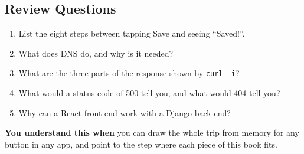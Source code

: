 \subsection*{Review Questions}\label{webapp-04:review-questions}

\begin{enumerate}
\def\labelenumi{\arabic{enumi}.}
\tightlist
\item
  List the eight steps between tapping Save and seeing ``Saved!''.
\item
  What does DNS do, and why is it needed?
\item
  What are the three parts of the response shown by \texttt{curl\ -i}?
\item
  What would a status code of 500 tell you, and what would 404 tell you?
\item
  Why can a React front end work with a Django back end?
\end{enumerate}

\begin{notebox}

\textbf{You understand this when} you can draw the whole trip from memory for any button in any app, and point to the step where each piece of this book fits.

\end{notebox}
